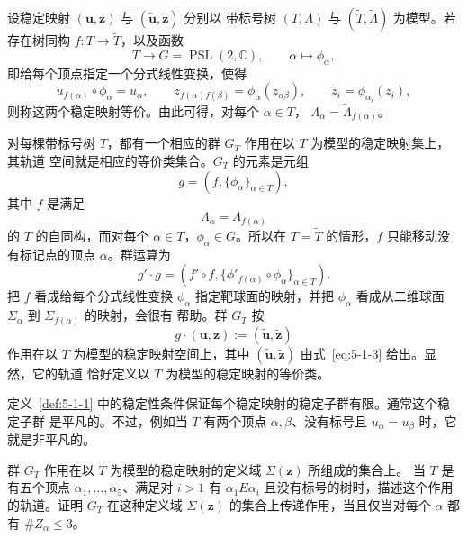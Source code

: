 \begin{definition}\label{def:5-1-4}
设稳定映射 $(\mathbf u,\mathbf z)$ 与 $(\widetilde{\mathbf u},\widetilde{\mathbf z})$ 分别以
带标号树 $(T,\Lambda)$ 与 $(\widetilde T,\widetilde\Lambda)$ 为模型。若存在树同构
$f:T\to\widetilde T$，以及函数
\[
  T\longrightarrow G=\operatorname{PSL}(2,\mathbb C),
  \qquad \alpha\longmapsto\phi_\alpha,
\]
即给每个顶点指定一个分式线性变换，使得
\begin{equation}\label{eq:5-1-3}
  \widetilde u_{f(\alpha)}\circ\phi_\alpha=u_\alpha,
  \qquad
  \widetilde z_{f(\alpha)f(\beta)}=\phi_\alpha(z_{\alpha\beta}),
  \qquad
  \widetilde z_i=\phi_{\alpha_i}(z_i),
\end{equation}
则称这两个稳定映射等价。由此可得，对每个 $\alpha\in T$，
$\Lambda_\alpha=\widetilde\Lambda_{f(\alpha)}$。
\end{definition}

对每棵带标号树 $T$，都有一个相应的群 $G_T$ 作用在以 $T$ 为模型的稳定映射集上，其轨道
空间就是相应的等价类集合。$G_T$ 的元素是元组
\[
  g=(f,\{\phi_\alpha\}_{\alpha\in T}),
\]
其中 $f$ 是满足
\[
  \Lambda_\alpha=\Lambda_{f(\alpha)}
\]
的 $T$ 的自同构，而对每个 $\alpha\in T$，$\phi_\alpha\in G$。所以在
$T=\widetilde T$ 的情形，$f$ 只能移动没有标记点的顶点 $\alpha$。群运算为
\[
  g'\cdot g
  =\left(f'\circ f,
    \{\phi'_{f(\alpha)}\circ\phi_\alpha\}_{\alpha\in T}\right).
\]
把 $f$ 看成给每个分式线性变换 $\phi_\alpha$ 指定靶球面的映射，并把
$\phi_\alpha$ 看成从二维球面 $\Sigma_\alpha$ 到 $\Sigma_{f(\alpha)}$ 的映射，会很有
帮助。群 $G_T$ 按
\[
  g\cdot(\mathbf u,\mathbf z)
  :=(\widetilde{\mathbf u},\widetilde{\mathbf z})
\]
作用在以 $T$ 为模型的稳定映射空间上，其中
$(\widetilde{\mathbf u},\widetilde{\mathbf z})$ 由式~\eqref{eq:5-1-3} 给出。显然，它的轨道
恰好定义以 $T$ 为模型的稳定映射的等价类。

定义~\ref{def:5-1-1} 中的稳定性条件保证每个稳定映射的稳定子群有限。通常这个稳定子群
是平凡的。不过，例如当 $T$ 有两个顶点 $\alpha,\beta$、没有标号且
$u_\alpha=u_\beta$ 时，它就是非平凡的。

\begin{exercise}\label{ex:5-1-5}
群 $G_T$ 作用在以 $T$ 为模型的稳定映射的定义域 $\Sigma(\mathbf z)$ 所组成的集合上。
当 $T$ 是有五个顶点 $\alpha_1,\ldots,\alpha_5$、满足对 $i>1$ 有
$\alpha_1E\alpha_i$ 且没有标号的树时，描述这个作用的轨道。证明 $G_T$ 在这种定义域
$\Sigma(\mathbf z)$ 的集合上传递作用，当且仅当对每个 $\alpha$ 都有 $\#Z_\alpha\le3$。
\end{exercise}

